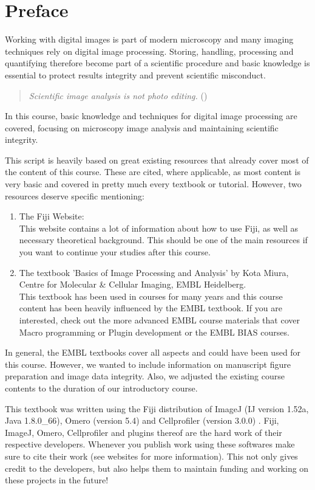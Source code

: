 \chapter*{Preface}

Working with digital images is part of modern microscopy and many imaging techniques rely on digital image processing. Storing, handling, processing and quantifying therefore become part of a scientific procedure and basic knowledge is essential to protect results integrity and prevent scientific misconduct. 

\begin{quote}
	\emph{Scientific image analysis is not photo editing.} (\cite{rossner2004})
\end{quote}

In this course, basic knowledge and techniques for digital image processing are covered, focusing on microscopy image analysis and maintaining scientific integrity. 


This script is heavily based on great existing resources that already cover most of the content of this course. These are cited, where applicable, as most content is very basic and covered in pretty much every textbook or tutorial. However, two resources deserve specific mentioning:
\begin{enumerate}
	\item The Fiji Website:\\This website contains a lot of information about how to use Fiji, as well as necessary theoretical background. This should be one of the main resources if you want to continue your studies after this course.
	\item The textbook 'Basics of Image Processing and Analysis' by Kota Miura, Centre for Molecular \& Cellular Imaging, EMBL Heidelberg.\\This textbook has been used in courses for many years and this course content has been heavily influenced by the EMBL textbook. If you are interested, check out the more advanced EMBL course materials that cover Macro programming or Plugin development or the EMBL BIAS courses.
\end{enumerate}

In general, the EMBL textbooks cover all aspects and could have been used for this course. However, we wanted to include information on manuscript figure preparation and image data integrity. Also, we adjusted the existing course contents to the duration of our introductory course.

This textbook was written using the Fiji distribution of ImageJ (IJ version 1.52a, Java 1.8.0\_66), Omero (version 5.4) and Cellprofiler (version 3.0.0) . Fiji, ImageJ, Omero, Cellprofiler and plugins thereof are the hard work of their respective developers. Whenever you publish work using these softwares make sure to cite their work (see websites for more information). This not only gives credit to the developers, but also helps them to maintain funding and working on these projects in the future!
